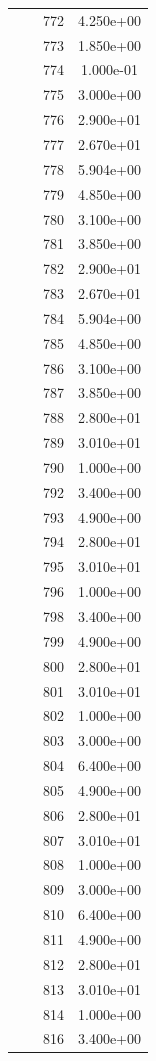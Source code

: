 \documentclass[12pt]{article}
\begin{document}
\begin{longtable}{@{}cccc@{}}
 &  & 772 & 4.250e+00 \\
 &  & 773 & 1.850e+00 \\
 &  & 774 & 1.000e-01 \\
 &  & 775 & 3.000e+00 \\
 &  & 776 & 2.900e+01 \\
 &  & 777 & 2.670e+01 \\
 &  & 778 & 5.904e+00 \\
 &  & 779 & 4.850e+00 \\
 &  & 780 & 3.100e+00 \\
 &  & 781 & 3.850e+00 \\
 &  & 782 & 2.900e+01 \\
 &  & 783 & 2.670e+01 \\
 &  & 784 & 5.904e+00 \\
 &  & 785 & 4.850e+00 \\
 &  & 786 & 3.100e+00 \\
 &  & 787 & 3.850e+00 \\
 &  & 788 & 2.800e+01 \\
 &  & 789 & 3.010e+01 \\
 &  & 790 & 1.000e+00 \\
 &  & 792 & 3.400e+00 \\
 &  & 793 & 4.900e+00 \\
 &  & 794 & 2.800e+01 \\
 &  & 795 & 3.010e+01 \\
 &  & 796 & 1.000e+00 \\
 &  & 798 & 3.400e+00 \\
 &  & 799 & 4.900e+00 \\
 &  & 800 & 2.800e+01 \\
 &  & 801 & 3.010e+01 \\
 &  & 802 & 1.000e+00 \\
 &  & 803 & 3.000e+00 \\
 &  & 804 & 6.400e+00 \\
 &  & 805 & 4.900e+00 \\
 &  & 806 & 2.800e+01 \\
 &  & 807 & 3.010e+01 \\
 &  & 808 & 1.000e+00 \\
 &  & 809 & 3.000e+00 \\
 &  & 810 & 6.400e+00 \\
 &  & 811 & 4.900e+00 \\
 &  & 812 & 2.800e+01 \\
 &  & 813 & 3.010e+01 \\
 &  & 814 & 1.000e+00 \\
 &  & 816 & 3.400e+00 \\

\bottomrule
\end{longtable}
\end{document}
